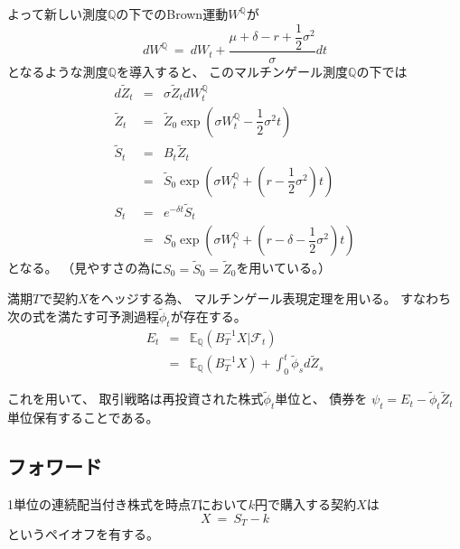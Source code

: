 \documentclass[uplatex,a4j,12pt,dvipdfmx]{jsarticle}
\begin{document}
よって新しい測度$\mathbb{Q}$の下でのBrown運動$W^{\mathbb{Q}}$が
$$
	d W^{\mathbb{Q}}
	\ = \
	d W_{t} + \dfrac{\mu + \delta -r + \dfrac{1}{2} \sigma^{2}}{\sigma} dt
$$
となるような測度$\mathbb{Q}$を導入すると、
このマルチンゲール測度$\mathbb{Q}$の下では
%
%
\begin{eqnarray*}
	d \tilde{Z}_{t}
	&=&
	\sigma \tilde{Z}_{t} d W^{\mathbb{Q}}_{t}
	\\
	\tilde{Z}_{t}
	&=&
	\tilde{Z}_{0}
	\exp
	\left(
	\sigma W^{\mathbb{Q}}_{t}
	- \dfrac{1}{2} \sigma^{2} t
	\right)
	\\
	\tilde{S}_{t}
	&=&
	B_{t} \tilde{Z}_{t}
	\\ &=&
	\tilde{S}_{0}
	\exp
	\left(
	\sigma W^{\mathbb{Q}}_{t}
	+
	\left(
	r
	-
	\dfrac{1}{2} \sigma^{2}
	\right)
	t
	\right)
	\\
	S_{t}
	&=&
	e^{-\delta t} \tilde{S}_{t}
	\\ &=&
	S_{0}
	\exp
	\left(
	\sigma W^{\mathbb{Q}}_{t}
	+
	\left(
	r
	- \delta
	- \dfrac{1}{2} \sigma^{2}
	\right)
	t
	\right)
\end{eqnarray*}
%
%
となる。
（見やすさの為に$S_{0}=\tilde{S}_{0}=\tilde{Z}_{0}$を用いている。）
${}$

満期$T$で契約$X$をヘッジする為、
マルチンゲール表現定理を用いる。
すなわち次の式を満たす可予測過程$\tilde{\phi}_{t}$が存在する。
%
%
\begin{eqnarray*}
	E_{t}
	&=&
	\mathbb{E}_{\mathbb{Q}} ( B_{T}^{-1} X | \mathcal{F}_{t} )
	\\
	&=&
	\mathbb{E}_{\mathbb{Q}} ( B_{T}^{-1} X )
	+
	\int^{t}_{0} \tilde{\phi}_{s} d \tilde{Z}_{s}
\end{eqnarray*}
%
%

これを用いて、
取引戦略は再投資された株式$\tilde{\phi}_{t}$単位と、
債券を
$\psi_{t}=E_{t} - \tilde{\phi}_{t} \tilde{Z}_{t}$
単位保有することである。
\subsection{フォワード}

1単位の連続配当付き株式を時点$T$において$k$円で購入する契約$X$は
$$
	X \ = \ S_{T} - k
$$
というペイオフを有する。
\end{document}
